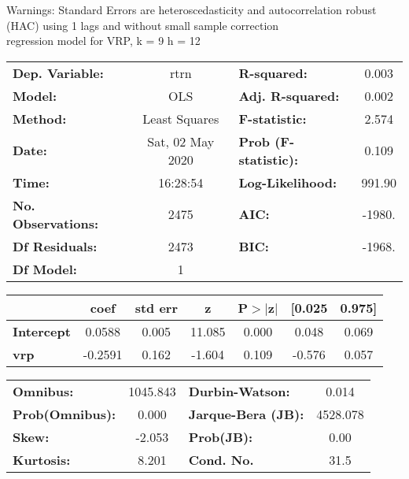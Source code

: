 Warnings: \newline
 [1] Standard Errors are heteroscedasticity and autocorrelation robust (HAC) using 1 lags and without small sample correction\\ 

regression model for VRP, k = 9 h = 12\begin{center}
\begin{tabular}{lclc}
\toprule
\textbf{Dep. Variable:}    &       rtrn       & \textbf{  R-squared:         } &     0.003   \\
\textbf{Model:}            &       OLS        & \textbf{  Adj. R-squared:    } &     0.002   \\
\textbf{Method:}           &  Least Squares   & \textbf{  F-statistic:       } &     2.574   \\
\textbf{Date:}             & Sat, 02 May 2020 & \textbf{  Prob (F-statistic):} &    0.109    \\
\textbf{Time:}             &     16:28:54     & \textbf{  Log-Likelihood:    } &    991.90   \\
\textbf{No. Observations:} &        2475      & \textbf{  AIC:               } &    -1980.   \\
\textbf{Df Residuals:}     &        2473      & \textbf{  BIC:               } &    -1968.   \\
\textbf{Df Model:}         &           1      & \textbf{                     } &             \\
\bottomrule
\end{tabular}
\begin{tabular}{lcccccc}
                   & \textbf{coef} & \textbf{std err} & \textbf{z} & \textbf{P$> |$z$|$} & \textbf{[0.025} & \textbf{0.975]}  \\
\midrule
\textbf{Intercept} &       0.0588  &        0.005     &    11.085  &         0.000        &        0.048    &        0.069     \\
\textbf{vrp}       &      -0.2591  &        0.162     &    -1.604  &         0.109        &       -0.576    &        0.057     \\
\bottomrule
\end{tabular}
\begin{tabular}{lclc}
\textbf{Omnibus:}       & 1045.843 & \textbf{  Durbin-Watson:     } &    0.014  \\
\textbf{Prob(Omnibus):} &   0.000  & \textbf{  Jarque-Bera (JB):  } & 4528.078  \\
\textbf{Skew:}          &  -2.053  & \textbf{  Prob(JB):          } &     0.00  \\
\textbf{Kurtosis:}      &   8.201  & \textbf{  Cond. No.          } &     31.5  \\
\bottomrule
\end{tabular}
\end{center}

